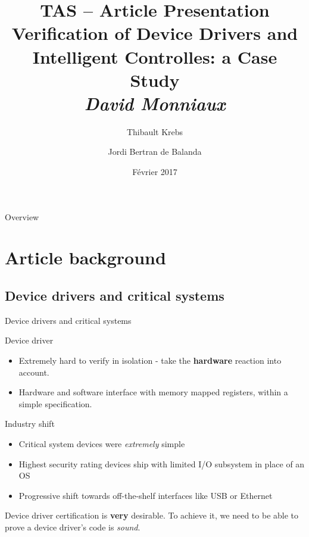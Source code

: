 \documentclass[aspectratio=169]{beamer}
\title{TAS -- Article Presentation \\ Verification of Device Drivers and Intelligent Controlles: a Case Study \\ \textit{David Monniaux}}
\author{Thibault Krebs \and Jordi Bertran de Balanda}
\date{Février 2017}
\begin{document}
\begin{frame}
  \titlepage
\end{frame}

\begin{frame}{Overview}
  \begin{multicols}{2}
    \tableofcontents
  \end{multicols}
\end{frame}

\section{Article background}

\subsection{Device drivers and critical systems}
\begin{frame}{Device drivers and critical systems}
    \begin{block}{Device driver}
    \begin{itemize}
        \item Extremely hard to verify in isolation - take the \textbf{hardware} reaction into account.
        \item Hardware and software interface with memory mapped registers, within a simple specification.
    \end{itemize}    
    \end{block}
    \begin{block}{Industry shift}
    \begin{itemize}
        \item Critical system devices were \textit{extremely} simple
        \item Highest security rating devices ship with limited I/O subsystem in place of an OS
        \item Progressive shift towards off-the-shelf interfaces like USB or Ethernet 
    \end{itemize}
    \end{block}
    Device driver certification is \textbf{very} desirable. To achieve it, we need to be able to prove a device driver's code is \textit{sound}.
\end{frame}
\end{document}
